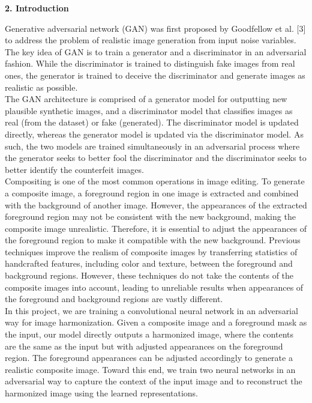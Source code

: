 \documentclass{article}
\begin{document}
\begin{flushleft}
\textbf{\large 2. Introduction}
\end{flushleft}

Generative adversarial network (GAN) was first proposed by Goodfellow et al. [3] to address the problem of realistic image generation from input noise variables. The key idea of GAN is to train a generator and a discriminator in an adversarial fashion. While the discriminator is trained to distinguish fake images from real ones, the generator is trained to deceive the discriminator and generate images as realistic as possible.\\

The GAN architecture is comprised of a generator model for outputting new plausible synthetic images, and a discriminator model that classifies images as real (from the dataset) or fake (generated). The discriminator model is updated directly, whereas the generator model is updated via the discriminator model. As such, the two models are trained simultaneously in an adversarial process where the generator seeks to better fool the discriminator and the discriminator seeks to better identify the counterfeit images.\\

Compositing is one of the most common operations in image editing. To generate a composite image, a foreground region in one image is extracted and combined with  the background of another image. However, the appearances of the extracted foreground region may not be consistent with the new background, making the composite image unrealistic. Therefore, it is essential to adjust the appearances of the foreground region to make it compatible with the new background. Previous techniques improve the realism of composite images by transferring statistics of handcrafted features, including color and texture, between the foreground and background regions. However, these techniques do not take the contents of the composite images into account, leading to unreliable results when appearances of the foreground and background regions are vastly different.\\

In this project, we are training a convolutional neural network in an adversarial way for image harmonization. Given a composite image and a foreground mask as the input, our model directly outputs a harmonized image, where the contents are the same as the input but with adjusted appearances on the foreground region. The foreground appearances can be adjusted accordingly to generate a realistic composite image. Toward this end, we train two neural networks in an adversarial way to capture the context of the input image and to reconstruct the harmonized image using the learned representations.\\
\end{document}
